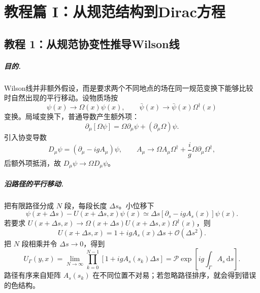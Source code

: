 \documentclass[UTF8,12pt,a4paper,twoside,openany]{ctexbook}
\newcommand{\dd}{\mathrm{d}}
\begin{document}
\clearpage
\chapter{教程篇 I：从规范结构到Dirac方程}
\label{sec:tutorial-gauge-dirac}

\section{教程 1：从规范协变性推导Wilson线}

\paragraph{目的.} Wilson线并非额外假设，而是要求两个不同地点的场在同一规范变换下能够比较时自然出现的平行移动。设物质场按
\begin{equation}
  \psi(x)\to\Omega(x)\psi(x),
  \qquad
  \bar\psi(x)\to\bar\psi(x)\Omega^\dagger(x)
  \label{eq:tutorial-matter-gauge}
\end{equation}
变换。局域变换下，普通导数产生额外项：
\begin{equation}
  \partial_\mu[\Omega\psi]
  =\Omega\partial_\mu\psi+(\partial_\mu\Omega)\psi.
  \label{eq:tutorial-derivative-extra}
\end{equation}
引入协变导数
\begin{equation}
  D_\mu\psi=(\partial_\mu-igA_\mu)\psi,
  \qquad
  A_\mu\to\Omega A_\mu\Omega^\dagger+\frac{i}{g}\Omega\partial_\mu\Omega^\dagger,
  \label{eq:tutorial-covariant-gauge}
\end{equation}
后额外项抵消，故 \(D_\mu\psi\to\Omega D_\mu\psi\)。

\paragraph{沿路径的平行移动.} 把有限路径分成 \(N\) 段，每段长度 \(\Delta s\)。小位移下
\begin{equation}
  \psi(x+\Delta s)-U(x+\Delta s,x)\psi(x)
  \simeq\Delta s\left[\partial_s-igA_s(x)\right]\psi(x).
  \label{eq:tutorial-small-transport}
\end{equation}
若要求 \(U(x+\Delta s,x)\to\Omega(x+\Delta s)U(x+\Delta s,x)\Omega^\dagger(x)\)，则
\begin{equation}
  U(x+\Delta s,x)
  =1+igA_s(x)\Delta s+\mathcal O(\Delta s^2).
  \label{eq:tutorial-link-infinitesimal}
\end{equation}
把 \(N\) 段相乘并令 \(\Delta s\to0\)，得到
\begin{equation}
  U_\Gamma(y,x)
  =\lim_{N\to\infty}\prod_{k=0}^{N-1}
  \left[1+igA_s(s_k)\Delta s\right]
  =\mathcal P\exp\left[ig\int_\Gamma A_s\,\dd s\right].
  \label{eq:tutorial-wilson-product}
\end{equation}
路径有序来自矩阵 \(A_s(s_k)\) 在不同位置不对易；若忽略路径排序，就会得到错误的色结构。
\end{document}
